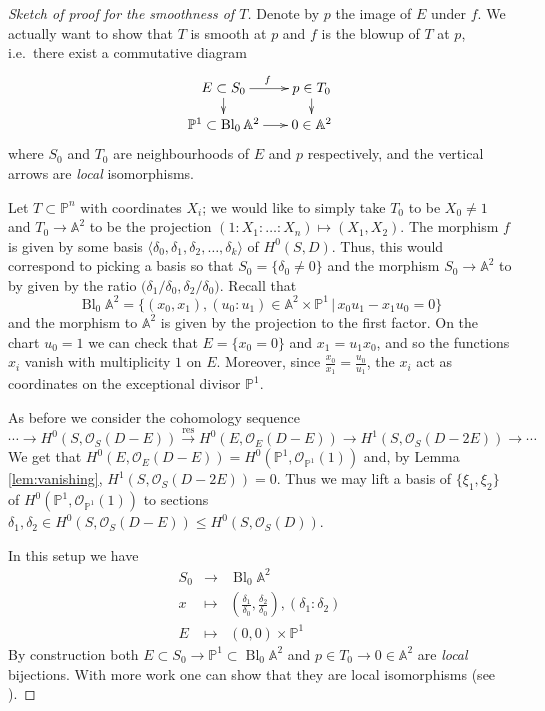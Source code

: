 \documentclass[a4paper,11pt]{amsart}
\def\Bl{\operatorname{Bl}}
\newcommand{\OO}{\mathcal{O}}
\renewcommand{\AA}{\mathbb{A}}
\newcommand{\PP}{\mathbb{P}}
\begin{document}
\begin{proof}[Sketch of proof for the smoothness of $T$]
	Denote by $p$ the image of $E$ under $f$.
	We actually want to show that $T$ is smooth at $p$ and $f$ is the blowup of $T$ at $p$, i.e.\ there exist a commutative diagram
	\[
	\xymatrix@R=.4cm@C=.6cm{
	E\subset S_0 \ar[r]^f \ar[d] & p \in T_0 \ar[d]\\
	\PP^1 \subset \Bl_0\AA^2 \ar[r] & 0 \in \AA^2
	}
	\]	
	where $S_0$ and $T_0$ are neighbourhoods of $E$ and $p$ respectively, and the vertical arrows are \emph{local} isomorphisms.
	
	Let $T \subset \PP^n$ with coordinates $X_i$;
	we would like to simply take $T_0$ to be $X_0 \neq 1$ and $T_0 \to \AA^2$ to be the projection $(1:X_1:\ldots:X_n) \mapsto (X_1,X_2)$.
	The morphism $f$ is given by some basis $\langle \delta_0,\delta_1,\delta_2,\dots, \delta_k\rangle$ of $H^0(S,D)$.	
	Thus, this would correspond to picking a basis so that $S_0 = \{\delta_0 \neq 0\}$ and the morphism $S_0 \to \AA^2$ to by given by the ratio $\big(\delta_1/\delta_0, \delta_2/\delta_0\big)$.
	Recall that 
	\[
	\Bl_0\AA^2 = \{(x_0,x_1),(u_0:u_1) \in \AA^2 \times \PP^1 \,|\, x_0u_1-x_1u_0 = 0\}
	\]
	and the morphism to $\AA^2$ is given by the projection to the first factor.
	On the chart $u_0 = 1$ we can check that $E = \{x_0=0\}$ and $x_1 = u_1x_0$, and so the functions $x_i$ vanish with multiplicity $1$ on $E$.
	Moreover, since $\frac{x_0}{x_1} = \frac{u_0}{u_1}$, the $x_i$ act as coordinates on the exceptional divisor $\PP^1$.
	
	As before we consider the cohomology sequence
	\begin{equation}\tag{$\star$}\label{eq:star}
	\cdots \to H^0(S,\OO_S(D-E)) \overset{\text{res}}{\longrightarrow} H^0(E,\OO_E(D-E)) \to H^1(S,\OO_S(D-2E)) \to \cdots
	\end{equation}
	We get that $H^0(E,\OO_E(D-E)) = H^0(\PP^1,\OO_{\PP^1}(1))$ and, by Lemma \ref{lem:vanishing}, $H^1(S,\OO_S(D-2E)) = 0$.
	Thus we may lift a basis of $\{\xi_1,\xi_2\}$ of $H^0(\PP^1,\OO_{\PP^1}(1))$ to sections $\delta_1,\delta_2 \in H^0(S,\OO_S(D-E)) \leq H^0(S,\OO_S(D))$.
	
	In this setup we have
	\[
	\begin{array}{ccc}
		S_0 & \to &  \Bl_0\AA^2 \\
		x & \mapsto & \left(\frac{\delta_1}{\delta_0},\frac{\delta_2}{\delta_0}\right), (\delta_1:\delta_2)\\
		E & \mapsto & (0,0) \times \PP^1
	\end{array}
	\]
	By construction both $E \subset S_0 \to \PP^1 \subset \Bl_0\AA^2$ and $p \in T_0 \to 0 \in \AA^2$ are \emph{local} bijections.
	With more work one can show that they are local isomorphisms (see \cite[Theorem 1.1.6]{Matsuki}).
\end{proof}
\end{document}
